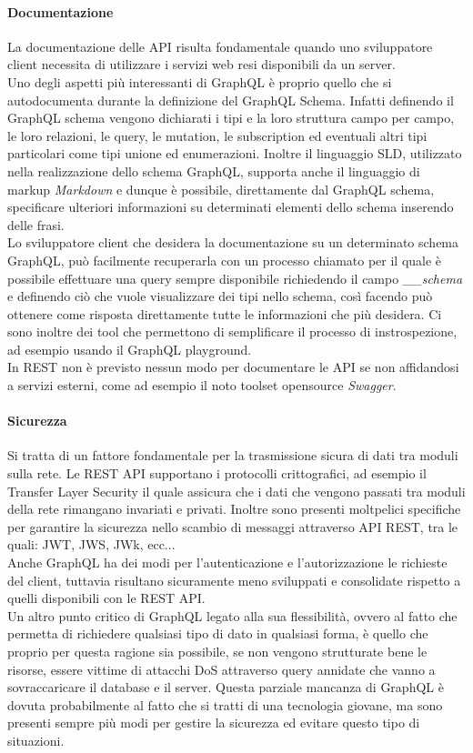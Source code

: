 \paragraph{Documentazione}
La documentazione delle API risulta fondamentale quando uno sviluppatore client necessita di utilizzare i servizi web resi disponibili da un server.\\
Uno degli aspetti più interessanti di GraphQL è proprio quello che si autodocumenta durante la definizione del GraphQL Schema. Infatti definendo il GraphQL schema vengono dichiarati i tipi e la loro struttura campo per campo, le loro relazioni, le query, le mutation, le subscription ed eventuali altri tipi particolari come tipi unione ed enumerazioni. Inoltre il linguaggio SLD, utilizzato nella realizzazione dello schema GraphQL, supporta anche il linguaggio di markup \textit{Markdown} e dunque è possibile, direttamente dal GraphQL schema, specificare ulteriori informazioni su determinati elementi dello schema inserendo delle frasi.\\
Lo sviluppatore client che desidera la documentazione su un determinato schema GraphQL, può facilmente recuperarla con un processo chiamato  per il quale è possibile effettuare una query sempre disponibile richiedendo il campo \textit{\_\_schema} e definendo ciò che vuole visualizzare dei tipi nello schema, così facendo può ottenere come risposta direttamente tutte le informazioni che più desidera. Ci sono inoltre dei tool che permettono di semplificare il processo di instrospezione, ad esempio usando il GraphQL playground.\\
In REST non è previsto nessun modo per documentare le API se non affidandosi a servizi esterni, come ad esempio il noto toolset opensource \textit{Swagger}.
\paragraph{Sicurezza}
Si tratta di un fattore fondamentale per la trasmissione sicura di dati tra moduli sulla rete. Le REST API supportano i protocolli crittografici, ad esempio il Transfer Layer Security il quale assicura che i dati che vengono passati tra moduli della rete rimangano invariati e privati. Inoltre sono presenti moltpelici specifiche per garantire la sicurezza nello scambio di messaggi attraverso API REST, tra le quali: JWT, JWS, JWk, ecc...\\
Anche GraphQL ha dei modi per l'autenticazione e l'autorizzazione le richieste del client, tuttavia risultano sicuramente meno sviluppati e consolidate rispetto a quelli disponibili con le REST API.\\
Un altro punto critico di GraphQL legato alla sua flessibilità, ovvero al fatto che permetta di richiedere qualsiasi tipo di dato in qualsiasi forma, è quello che proprio per questa ragione sia possibile, se non vengono strutturate bene le risorse, essere vittime di attacchi DoS attraverso query annidate che vanno a sovraccaricare il database e il server. Questa parziale mancanza di GraphQL è dovuta probabilmente al fatto che si tratti di una tecnologia giovane, ma sono presenti sempre più modi per gestire la sicurezza ed evitare questo tipo di situazioni.
